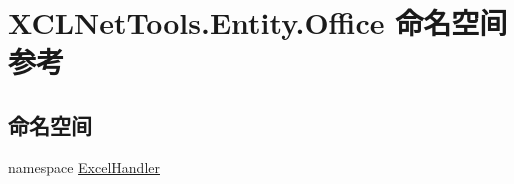 \hypertarget{namespace_x_c_l_net_tools_1_1_entity_1_1_office}{}\section{X\+C\+L\+Net\+Tools.\+Entity.\+Office 命名空间参考}
\label{namespace_x_c_l_net_tools_1_1_entity_1_1_office}
\subsection*{命名空间}
\begin{DoxyCompactItemize}
\item 
namespace \hyperlink{namespace_x_c_l_net_tools_1_1_entity_1_1_office_1_1_excel_handler}{Excel\+Handler}
\end{DoxyCompactItemize}
